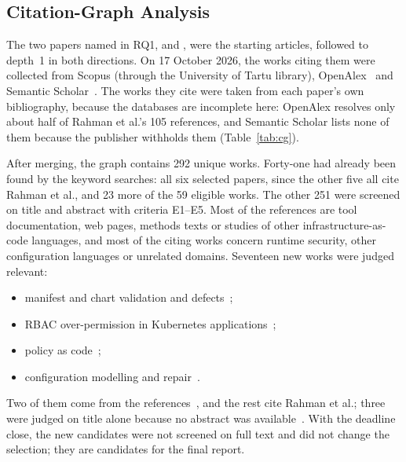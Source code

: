 \documentclass[sigconf,nonacm]{acmart}
\begin{document}
\subsection{Citation-Graph Analysis}
\label{sec:citegraph}

The two papers named in RQ1, \citet{rahman2023} and \citet{minna2025}, were the starting articles, followed to depth~1 in both directions. On 17 October 2026, the works citing them were collected from Scopus (through the University of Tartu library), OpenAlex~\cite{openalex} and Semantic Scholar~\cite{semanticscholar}. The works they cite were taken from each paper's own bibliography, because the databases are incomplete here: OpenAlex resolves only about half of Rahman et al.'s 105 references, and Semantic Scholar lists none of them because the publisher withholds them (Table~\ref{tab:cg}).

After merging, the graph contains 292 unique works. Forty-one had already been found by the keyword searches: all six selected papers, since the other five all cite Rahman et al., and 23 more of the 59 eligible works. The other 251 were screened on title and abstract with criteria E1--E5. Most of the references are tool documentation, web pages, methods texts or studies of other infrastructure-as-code languages, and most of the citing works concern runtime security, other configuration languages or unrelated domains. Seventeen new works were judged relevant:

\begin{itemize}
  \item manifest and chart validation and defects~\cite{diarra2025demo,zhang2024genai,bufalino2025helmet,rahman2025minor,bose2021underreported,blaise2022helm};
  \item RBAC over-permission in Kubernetes applications~\cite{yang2023takeover,gu2025epscan,sun2025kubeguard,zheng2026kubesec};
  \item policy as code~\cite{opdebeeck2026pac,onal2026opa};
  \item configuration modelling and repair~\cite{horcas2025variability,flores2026synthesis,kavousi2026configwiz,liao2024deployfix,minna2025thesis}.
\end{itemize}

\noindent Two of them come from the references~\cite{bose2021underreported,blaise2022helm}, and the rest cite Rahman et al.; three were judged on title alone because no abstract was available~\cite{zheng2026kubesec,flores2026synthesis,kavousi2026configwiz}. With the deadline close, the new candidates were not screened on full text and did not change the selection; they are candidates for the final report.
\end{document}
